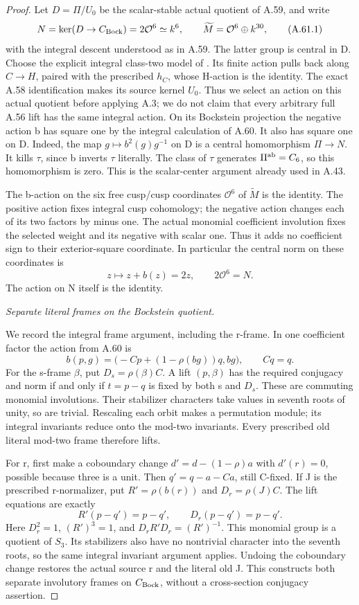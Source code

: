 \begin{proof}
Let \(D=\Pi/U_0\) be the scalar-stable actual quotient of A.59,
and write
\[
 N=\ker(D\to C_{\rm Bock})=2\mathcal O^6\simeq k^6,
 \qquad
 \widetilde M=\mathcal O^6\oplus k^{30},
 \tag{A.61.1}
\]
with the integral descent understood as in A.59. The latter
group is central in D. Choose the explicit integral class-two
model of . Its finite action
pulls back along \(C\to H\), paired with the prescribed
\(h_C\), whose H-action is the identity. The exact A.58
identification makes its source kernel \(U_0\). Thus we select
an action on this actual quotient before applying A.3; we do
not claim that every arbitrary full A.56 lift has the same
integral action. On its Bockstein projection the negative
action b has square one by the integral calculation of A.60.
It also has square one on D. Indeed, the map
\(g\mapsto b^2(g)g^{-1}\) on D is a central homomorphism
\(\Pi\to N\). It kills \(\tau\), since b inverts \(\tau\)
literally. The class of \(\tau\) generates
\(\Pi^{\rm ab}=C_6\), so this homomorphism is zero. This is
the scalar-center argument already used in A.43.

The b-action on the six free cusp/cusp coordinates
\(\mathcal O^6\) of \(\widetilde M\) is the identity.
The positive action fixes integral cusp cohomology; the
negative action changes each of its two factors by minus one.
The actual monomial coefficient involution fixes the selected
weight and its negative with scalar one. Thus it adds no
coefficient sign to their exterior-square coordinate. In
particular the central norm on these coordinates is
\[
 z\longmapsto z+b(z)=2z,
 \qquad 2\mathcal O^6=N.
 \tag{A.61.2}
\]
The action on N itself is the identity.

\emph{Separate literal frames on the Bockstein quotient.}\par
We record the integral frame argument, including the r-frame.
In one coefficient factor the action from A.60 is
\[
 b(p,g)=\bigl(-Cp+(1-\rho(bg))q,bg\bigr),\qquad Cq=q.
 \tag{A.61.3}
\]
For the s-frame \(\beta\), put \(D_s=\rho(\beta)C\).
A lift \((p,\beta)\) has the required conjugacy and norm if
and only if \(t=p-q\) is fixed by both s and \(D_s\).
These are commuting monomial involutions. Their stabilizer
characters take values in seventh roots of unity, so are
trivial. Rescaling each orbit makes a permutation module;
its integral invariants reduce onto the mod-two invariants.
Every prescribed old literal mod-two frame therefore lifts.

For r, first make a coboundary change
\(d'=d-(1-\rho)a\) with \(d'(r)=0\), possible because
three is a unit. Then \(q'=q-a-Ca\), still C-fixed. If J is
the prescribed r-normalizer, put
\(R'=\rho(b(r))\) and \(D_r=\rho(J)C\).
The lift equations are exactly
\[
 R'(p-q')=p-q',\qquad D_r(p-q')=p-q'.
 \tag{A.61.4}
\]
Here \(D_r^2=1\), \((R')^3=1\), and
\(D_rR'D_r=(R')^{-1}\). This monomial group is a quotient
of \(S_3\). Its stabilizers also have no nontrivial character
into the seventh roots, so the same integral invariant
argument applies. Undoing the coboundary change restores the
actual source r and the literal old J. This constructs both
separate involutory frames on \(C_{\rm Bock}\), without a
cross-section conjugacy assertion.


\end{proof}
